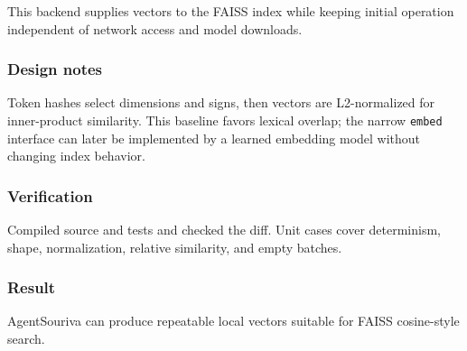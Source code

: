 This backend supplies vectors to the FAISS index while keeping initial operation independent of network access and model downloads.

\subsubsection{Design notes}

Token hashes select dimensions and signs, then vectors are L2-normalized for inner-product similarity. This baseline favors lexical overlap; the narrow \texttt{embed} interface can later be implemented by a learned embedding model without changing index behavior.

\subsubsection{Verification}

Compiled source and tests and checked the diff. Unit cases cover determinism, shape, normalization, relative similarity, and empty batches.

\subsubsection{Result}

AgentSouriva can produce repeatable local vectors suitable for FAISS cosine-style search.

